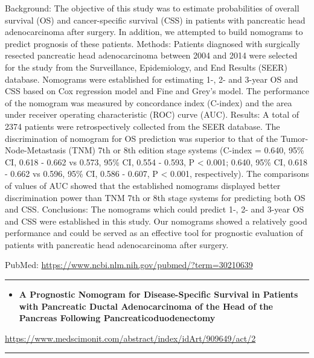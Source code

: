 \documentclass[]{article}
\providecommand{\tightlist}{%
  \setlength{\itemsep}{0pt}\setlength{\parskip}{0pt}}
\begin{document}
Background: The objective of this study was to estimate probabilities of
overall survival (OS) and cancer-specific survival (CSS) in patients
with pancreatic head adenocarcinoma after surgery. In addition, we
attempted to build nomograms to predict prognosis of these patients.
Methods: Patients diagnosed with surgically resected pancreatic head
adenocarcinoma between 2004 and 2014 were selected for the study from
the Surveillance, Epidemiology, and End Results (SEER) database.
Nomograms were established for estimating 1-, 2- and 3-year OS and CSS
based on Cox regression model and Fine and Grey's model. The performance
of the nomogram was measured by concordance index (C-index) and the area
under receiver operating characteristic (ROC) curve (AUC). Results: A
total of 2374 patients were retrospectively collected from the SEER
database. The discrimination of nomogram for OS prediction was superior
to that of the Tumor-Node-Metastasis (TNM) 7th or 8th edition stage
systems (C-index = 0.640, 95\% CI, 0.618 - 0.662 vs 0.573, 95\% CI,
0.554 - 0.593, P \textless{} 0.001; 0.640, 95\% CI, 0.618 - 0.662 vs
0.596, 95\% CI, 0.586 - 0.607, P \textless{} 0.001, respectively). The
comparisons of values of AUC showed that the established nomograms
displayed better discrimination power than TNM 7th or 8th stage systems
for predicting both OS and CSS. Conclusions: The nomograms which could
predict 1-, 2- and 3-year OS and CSS were established in this study. Our
nomograms showed a relatively good performance and could be served as an
effective tool for prognostic evaluation of patients with pancreatic
head adenocarcinoma after surgery.

PubMed: \url{https://www.ncbi.nlm.nih.gov/pubmed/?term=30210639}

{}

{}

\begin{center}\rule{0.5\linewidth}{\linethickness}\end{center}

\begin{itemize}
\tightlist
\item
  \textbf{A Prognostic Nomogram for Disease-Specific Survival in
  Patients with Pancreatic Ductal Adenocarcinoma of the Head of the
  Pancreas Following Pancreaticoduodenectomy}
\end{itemize}

\url{https://www.medscimonit.com/abstract/index/idArt/909649/act/2}

\begin{center}\rule{0.5\linewidth}{\linethickness}\end{center}
\end{document}
